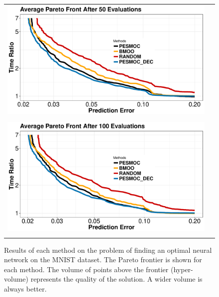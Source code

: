 \documentclass[review,preprint,12pt]{elsarticle}
\begin{document}

\begin{figure}[H]
\begin{center}
        \begin{tabular}{cc}
                \vspace{-.2cm}
                \includegraphics[width=0.75\linewidth]{figures/real/50_nnet.pdf} \\ \\
                \includegraphics[width=0.75\linewidth]{figures/real/100_nnet.pdf} \\
                \vspace{-.1cm}
        \end{tabular}
        \caption{Results of each method on the problem of finding an optimal neural network on the MNIST dataset.
		The Pareto frontier is shown for each method. The volume of points above the frontier 
		(hyper-volume) represents the quality of the solution. A wider volume is always better.}
        \label{fig:nnet_results}
\end{center}
\end{figure}

\end{document}
